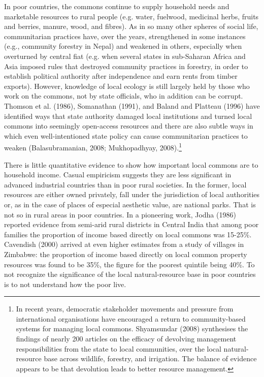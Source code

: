 \documentclass[man,11pt,a4paper,floatsintext]{apa7}
\begin{document}
In poor countries, the commons continue to supply household needs and marketable resources to rural people (e.g. water, fuelwood, medicinal herbs, fruits and berries, manure, wood, and fibres). As in so many other spheres of social life, communitarian practices have, over the years, strengthened in some instances (e.g., community forestry in Nepal) and weakened in others, especially when overturned by central fiat (e.g. when several states in sub-Saharan Africa and Asia imposed rules that destroyed community practices in forestry, in order to establish political authority after independence and earn rents from timber exports). However, knowledge of local ecology is still largely held by those who work on the commons, not by state officials, who in addition can be corrupt. Thomson et al. (1986), Somanathan (1991), and Baland and Platteau (1996) have identified ways that state authority damaged local institutions and turned local commons into seemingly open-access resources and there are also subtle ways in which even well-intentioned state policy can cause communitarian practices to weaken (Balasubramanian, 2008; Mukhopadhyay, 2008).\footnote{In recent years, democratic stakeholder movements and pressure from international organisations have encouraged a return to community-based systems for managing local commons. Shyamsundar (2008) synthesises the findings of nearly 200 articles on the efficacy of devolving management responsibilities from the state to local communities, over the local natural-resource base across wildlife, forestry, and irrigation. The balance of evidence appears to be that devolution leads to better resource management.}

There is little quantitative evidence to show how important local commons are to household income. Casual empiricism suggests they are less significant in advanced industrial countries than in poor rural societies. In the former, local resources are either owned privately, fall under the jurisdiction of local authorities or, as in the case of places of especial aesthetic value, are national parks. That is not so in rural areas in poor countries. In a pioneering work, Jodha (1986) reported evidence from semi-arid rural districts in Central India that among poor families the proportion of income based directly on local commons was 15-25\%. Cavendish (2000) arrived at even higher estimates from a study of villages in Zimbabwe: the proportion of income based directly on local common property resources was found to be 35\%, the figure for the poorest quintile being 40\%. To not recognize the significance of the local natural-resource base in poor countries is to not understand how the poor live.
\end{document}
